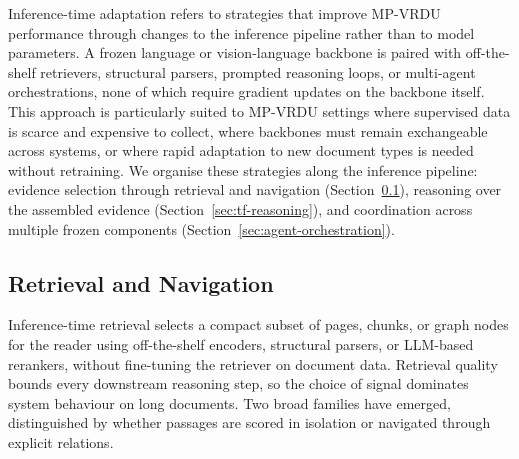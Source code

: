 \documentclass[11pt]{article}
\begin{document}
Inference-time adaptation refers to strategies that improve MP-VRDU performance through changes to the inference pipeline rather than to model parameters. A frozen language or vision-language backbone is paired with off-the-shelf retrievers, structural parsers, prompted reasoning loops, or multi-agent orchestrations, none of which require gradient updates on the backbone itself. This approach is particularly suited to MP-VRDU settings where supervised data is scarce and expensive to collect, where backbones must remain exchangeable across systems, or where rapid adaptation to new document types is needed without retraining. We organise these strategies along the inference pipeline: evidence selection through retrieval and navigation (Section~\ref{sec:tf-retrieval}), reasoning over the assembled evidence (Section~\ref{sec:tf-reasoning}), and coordination across multiple frozen components (Section~\ref{sec:agent-orchestration}).

\subsection{Retrieval and Navigation}
\label{sec:tf-retrieval}

Inference-time retrieval selects a compact subset of pages, chunks, or graph nodes for the reader using off-the-shelf encoders, structural parsers, or LLM-based rerankers, without fine-tuning the retriever on document data. Retrieval quality bounds every downstream reasoning step, so the choice of signal dominates system behaviour on long documents. Two broad families have emerged, distinguished by whether passages are scored in isolation or navigated through explicit relations.
\end{document}
